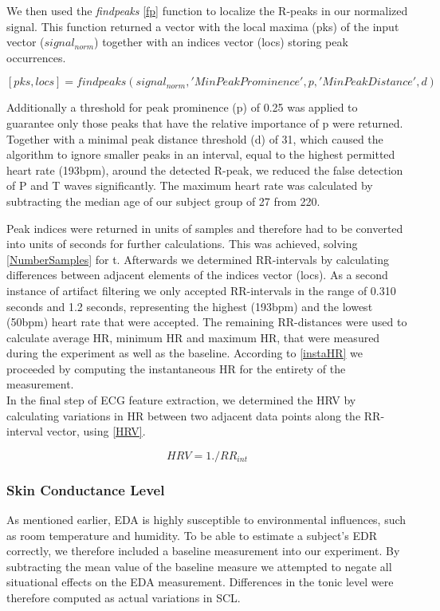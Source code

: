 We then used the \textit{findpeaks} \ref{fp} function to localize the R-peaks in our normalized signal. This function returned a vector with the local maxima (pks) of the input vector ($signal_{norm}$) together with an indices vector (locs) storing peak occurrences. 

\begin{equation*}\label{fp}
[pks,locs] = findpeaks(signal_{norm},'MinPeakProminence',p,'MinPeakDistance',d)
\end{equation*}

Additionally a threshold for peak prominence (p) of 0.25 was applied to guarantee only those peaks that have the relative importance of p were returned. Together with a minimal peak distance threshold (d) of 31, which caused the algorithm to ignore smaller peaks in an interval, equal to the highest permitted heart rate (193bpm), around the detected R-peak, we reduced the false detection of P and T waves significantly. The maximum heart rate was calculated by subtracting the median age of our subject group of 27 from 220. 

Peak indices were returned in units of samples and therefore had to be converted into units of seconds for further calculations. This was achieved, solving \ref{NumberSamples} for t. Afterwards we 
determined RR-intervals by calculating differences between adjacent elements of the indices vector (locs). As a second instance of artifact filtering we only accepted RR-intervals in the range of 0.310 seconds and 1.2 seconds, representing the highest (193bpm) and the lowest (50bpm) heart rate that were accepted. The remaining RR-distances were used to calculate average HR, minimum HR and maximum HR, that were measured during the experiment as well as the baseline. According to \ref{instaHR} we proceeded by computing the instantaneous HR for the entirety of the measurement.\\

In the final step of ECG feature extraction, we determined the HRV by calculating variations in HR between two adjacent data points along the RR-interval vector, using \ref{HRV}.

\begin{equation}\label{HRV}
HRV = 1./RR_{int}
\end{equation}  

\subsubsection{Skin Conductance Level}
As mentioned earlier, EDA is highly susceptible to environmental influences, such as room temperature and humidity. To be able to estimate a subject's EDR correctly, we therefore included a baseline measurement into our experiment. By subtracting the mean value of the baseline measure we attempted to negate all situational effects on the EDA measurement. Differences in the tonic level were therefore computed as actual variations in SCL.  

